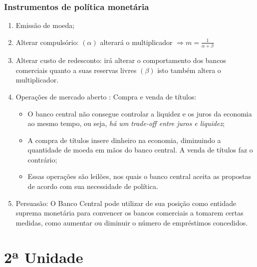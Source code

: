 \documentclass[12pt,a4paper,oneside,brazil]{abntex2}
\begin{document}
\subsection{Instrumentos de política monetária}
\begin{enumerate}
\item Emissão de moeda;
\item Alterar compulsório: $(\alpha)$ alterará o multiplicador $\Rightarrow m = \frac{1}{\alpha + \beta}$
\item Alterar custo de redesconto: irá alterar o comportamento dos bancos comerciais quanto a suas reservas livres $(\beta)$ isto também altera o multiplicador.
\item Operações de mercado aberto : Compra e venda de títulos:
\begin{itemize}
\item O banco central não consegue controlar a liquidez e os juros da economia ao mesmo tempo, ou seja, \emph{há um trade-off entre juros e liquidez};
\item A compra de títulos insere dinheiro na economia, diminuindo a quantidade de moeda em mãos do banco central. A venda de títulos faz o contrário;
\item Essas operações são leilões, nos quais o banco central aceita as propostas de acordo com sua necessidade de política.
\end{itemize}
\item Persuasão: O Banco Central pode utilizar de sua posição como entidade suprema monetária para convencer os bancos comerciais a tomarem certas medidas, como aumentar ou diminuir o número de empréstimos concedidos.
\end{enumerate}

\chapter{2ª Unidade}

\printbibliography
\end{document}
